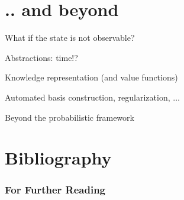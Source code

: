 \section{.. and beyond}
{
\bi
\item What if the state is not observable?
\item Abstractions: time!?
\item Knowledge representation (and value functions)
\item Automated basis construction, regularization, $\ldots$
\item Beyond the probabilistic framework
\ei
}

\section{Bibliography}
\begin{frame}
  \frametitle{For Further Reading}
  \begin{multicols}{2}
  \scriptsize\tiny
\def\newblock{\hskip .11em plus .33em minus .07em}

  \end{multicols}
\emptynote
\end{frame}


